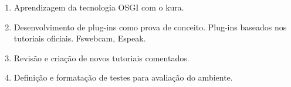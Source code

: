 \begin{enumerate}
  \item Aprendizagem da tecnologia OSGI com o kura.
  \item Desenvolvimento de plug-ins como prova de conceito.
  \subitem Plug-ins baseados nos tutoriais oficiais.
  \subitem Fswebcam, Espeak.
  \item Revisão e criação de novos tutoriais comentados.
  \item Definição e formatação de testes para avaliação do ambiente.
\end{enumerate} 